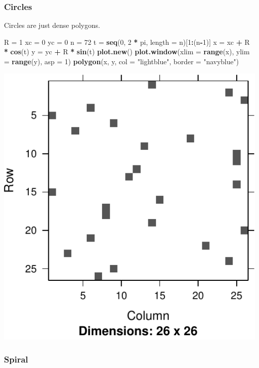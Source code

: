 \documentclass[]{book}
\newenvironment{Shaded}{\begin{snugshade}}{\end{snugshade}}
\newcommand{\KeywordTok}[1]{\textcolor[rgb]{0.13,0.29,0.53}{\textbf{#1}}}
\newcommand{\DataTypeTok}[1]{\textcolor[rgb]{0.13,0.29,0.53}{#1}}
\newcommand{\DecValTok}[1]{\textcolor[rgb]{0.00,0.00,0.81}{#1}}
\newcommand{\StringTok}[1]{\textcolor[rgb]{0.31,0.60,0.02}{#1}}
\newcommand{\OperatorTok}[1]{\textcolor[rgb]{0.81,0.36,0.00}{\textbf{#1}}}
\newcommand{\NormalTok}[1]{#1}
\theoremstyle{definition}
\theoremstyle{definition}
\theoremstyle{definition}
\theoremstyle{remark}
\begin{document}
\subsubsection{Circles}\label{circles}

Circles are just dense polygons.

\begin{Shaded}
\begin{Highlighting}[]
\NormalTok{R =}\StringTok{ }\DecValTok{1}
\NormalTok{xc =}\StringTok{ }\DecValTok{0}
\NormalTok{yc =}\StringTok{ }\DecValTok{0}
\NormalTok{n =}\StringTok{ }\DecValTok{72}
\NormalTok{t =}\StringTok{ }\KeywordTok{seq}\NormalTok{(}\DecValTok{0}\NormalTok{, }\DecValTok{2} \OperatorTok{*}\StringTok{ }\NormalTok{pi, }\DataTypeTok{length =}\NormalTok{ n)[}\DecValTok{1}\OperatorTok{:}\NormalTok{(n}\OperatorTok{-}\DecValTok{1}\NormalTok{)]}
\NormalTok{x =}\StringTok{ }\NormalTok{xc }\OperatorTok{+}\StringTok{ }\NormalTok{R }\OperatorTok{*}\StringTok{ }\KeywordTok{cos}\NormalTok{(t)}
\NormalTok{y =}\StringTok{ }\NormalTok{yc }\OperatorTok{+}\StringTok{ }\NormalTok{R }\OperatorTok{*}\StringTok{ }\KeywordTok{sin}\NormalTok{(t)}
\KeywordTok{plot.new}\NormalTok{()}
\KeywordTok{plot.window}\NormalTok{(}\DataTypeTok{xlim =} \KeywordTok{range}\NormalTok{(x), }\DataTypeTok{ylim =} \KeywordTok{range}\NormalTok{(y), }\DataTypeTok{asp =} \DecValTok{1}\NormalTok{)}
\KeywordTok{polygon}\NormalTok{(x, y, }\DataTypeTok{col =} \StringTok{"lightblue"}\NormalTok{, }\DataTypeTok{border =} \StringTok{"navyblue"}\NormalTok{)}
\end{Highlighting}
\end{Shaded}

\includegraphics[width=0.5\linewidth]{Rcourse_files/figure-latex/unnamed-chunk-282-1}

\subsubsection{Spiral}\label{spiral}
\end{document}

